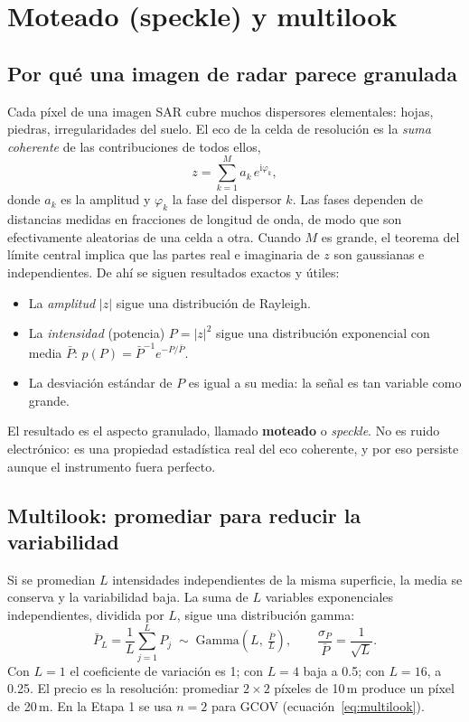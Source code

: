 \documentclass[11pt,a4paper]{article}
\begin{document}
\section{Moteado (speckle) y multilook}
\label{sec:speckle}

\subsection{Por qué una imagen de radar parece granulada}

Cada píxel de una imagen SAR cubre muchos dispersores elementales: hojas, piedras, irregularidades del suelo.
El eco de la celda de resolución es la \emph{suma coherente} de las contribuciones de todos ellos,
\begin{equation}
  z = \sum_{k=1}^{M} a_k\, e^{\mathrm{i}\varphi_k},
  \label{eq:fasor}
\end{equation}
donde $a_k$ es la amplitud y $\varphi_k$ la fase del dispersor $k$. Las fases dependen de distancias medidas
en fracciones de longitud de onda, de modo que son efectivamente aleatorias de una celda a otra. Cuando $M$ es
grande, el teorema del límite central implica que las partes real e imaginaria de $z$ son gaussianas e
independientes. De ahí se siguen resultados exactos y útiles:
\begin{itemize}
  \item La \emph{amplitud} $|z|$ sigue una distribución de Rayleigh.
  \item La \emph{intensidad} (potencia) $P=|z|^2$ sigue una distribución exponencial con media $\bar P$:
        $p(P)=\bar P^{-1}e^{-P/\bar P}$.
  \item La desviación estándar de $P$ es igual a su media: la señal es tan variable como grande.
\end{itemize}
El resultado es el aspecto granulado, llamado \textbf{moteado} o \emph{speckle}. No es ruido electrónico: es
una propiedad estadística real del eco coherente, y por eso persiste aunque el instrumento fuera perfecto.

\subsection{Multilook: promediar para reducir la variabilidad}

Si se promedian $L$ intensidades independientes de la misma superficie, la media se conserva y la variabilidad
baja. La suma de $L$ variables exponenciales independientes, dividida por $L$, sigue una distribución gamma:
\begin{equation}
  \bar P_L = \frac{1}{L}\sum_{j=1}^{L}P_j
  \;\sim\; \mathrm{Gamma}\!\left(L,\ \tfrac{\bar P}{L}\right),
  \qquad
  \frac{\sigma_{P}}{\bar P} = \frac{1}{\sqrt{L}}.
  \label{eq:gamma-ml}
\end{equation}
Con $L=1$ el coeficiente de variación es 1; con $L=4$ baja a 0.5; con $L=16$, a 0.25. El precio es la
resolución: promediar $2\times2$ píxeles de 10\,m produce un píxel de 20\,m. En la Etapa 1 se usa
$n=2$ para GCOV (ecuación~\eqref{eq:multilook}).
\end{document}
